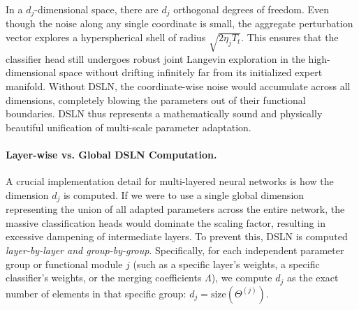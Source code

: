 In a $d_j$-dimensional space, there are $d_j$ orthogonal degrees of freedom.
Even though the noise along any single coordinate is small, the aggregate perturbation vector explores a hyperspherical shell of radius $\sqrt{2\eta_j T_t}$.
This ensures that the classifier head still undergoes robust joint Langevin exploration in the high-dimensional space without drifting infinitely far from its initialized expert manifold.
Without DSLN, the coordinate-wise noise would accumulate across all dimensions, completely blowing the parameters out of their functional boundaries.
DSLN thus represents a mathematically sound and physically beautiful unification of multi-scale parameter adaptation.

\paragraph{Layer-wise vs. Global DSLN Computation.} A crucial implementation detail for multi-layered neural networks is how the dimension $d_j$ is computed.
If we were to use a single global dimension representing the union of all adapted parameters across the entire network, the massive classification heads would dominate the scaling factor, resulting in excessive dampening of intermediate layers.
To prevent this, DSLN is computed \emph{layer-by-layer and group-by-group}.
Specifically, for each independent parameter group or functional module $j$ (such as a specific layer's weights, a specific classifier's weights, or the merging coefficients $\Lambda$), we compute $d_j$ as the exact number of elements in that specific group: $d_j = \text{size}(\Theta^{(j)})$.


